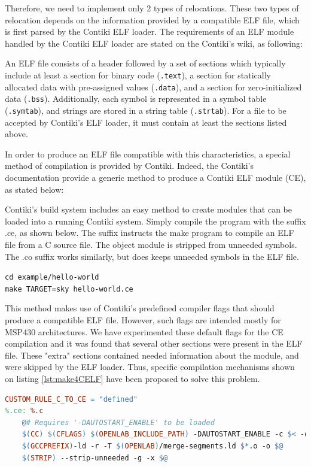 Therefore, we need to implement only 2 types of relocations.
These two types of relocation depends on the information provided by a compatible ELF file, which is first parsed by the Contiki ELF loader.
The requirements of an ELF module handled by the Contiki ELF loader are stated on the Contiki's wiki, as following:

\begin{citeverbatim}
	An ELF file consists of a header followed by a set of sections which typically include at least a section for binary code (\texttt{.text}), a section for statically allocated data with pre-assigned values (\texttt{.data}), and a section for zero-initialized data (\texttt{.bss}).
	Additionally, each symbol is represented in a symbol table (\texttt{.symtab}), and strings are stored in a string table (\texttt{.strtab}). 
	For a file to be accepted by Contiki's ELF loader, it must contain at least the sections listed above. 
\end{citeverbatim}

In order to produce an ELF file compatible with this characteristics, a special method of compilation is provided by Contiki.
Indeed, the Contiki's documentation provide a generic method to produce a Contiki ELF module (CE), as stated below:

\begin{citeverbatim}
	Contiki's build system includes an easy method to create modules that can be loaded into a running Contiki system.
	Simply compile the program with the suffix .ce, as shown below. 
	The suffix instructs the make program to compile an ELF file from a C source file. 
	The object module is stripped from unneeded symbols. 
	The .co suffix works similarly, but does keeps unneeded symbols in the ELF file. 
	
	\texttt{cd example/hello-world} \\
	\texttt{make TARGET=sky hello-world.ce}
\end{citeverbatim}

This method makes use of Contiki's predefined compiler flags that should produce a compatible ELF file.
However, such flags are intended mostly for MSP430 architectures.
We have experimented these default flags for the CE compilation and it was found that several other sections were present in the ELF file.
These "extra" sections contained needed information about the module, and were skipped by the ELF loader.
Thus, specific compilation mechanisms shown on listing \ref{lst:make4CELF} have been proposed to solve this problem.
\\
\begin{lstlisting}[language=make, caption=Compilation instructions to generate an ARM ELF file., label=lst:make4CELF]
CUSTOM_RULE_C_TO_CE = "defined"
%.ce: %.c
	@# Requires '-DAUTOSTART_ENABLE' to be loaded
	$(CC) $(CFLAGS) $(OPENLAB_INCLUDE_PATH) -DAUTOSTART_ENABLE -c $< -o $*.o
	$(GCCPREFIX)-ld -r -T $(OPENLAB)/merge-segments.ld $*.o -o $@
	$(STRIP) --strip-unneeded -g -x $@
\end{lstlisting}

